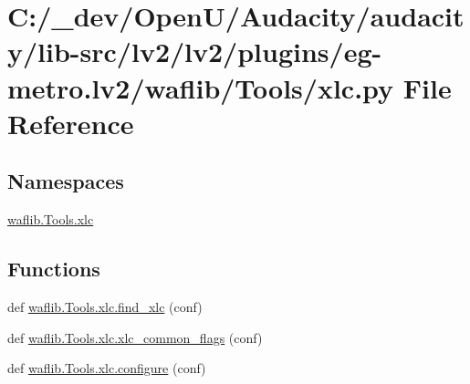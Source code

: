 \hypertarget{lv2_2plugins_2eg-metro_8lv2_2waflib_2_tools_2xlc_8py}{}\section{C\+:/\+\_\+dev/\+Open\+U/\+Audacity/audacity/lib-\/src/lv2/lv2/plugins/eg-\/metro.lv2/waflib/\+Tools/xlc.py File Reference}
\label{lv2_2plugins_2eg-metro_8lv2_2waflib_2_tools_2xlc_8py}
\subsection*{Namespaces}
\begin{DoxyCompactItemize}
\item 
 \hyperlink{namespacewaflib_1_1_tools_1_1xlc}{waflib.\+Tools.\+xlc}
\end{DoxyCompactItemize}
\subsection*{Functions}
\begin{DoxyCompactItemize}
\item 
def \hyperlink{namespacewaflib_1_1_tools_1_1xlc_a826e1c437600d3c067bccbbd4064dec9}{waflib.\+Tools.\+xlc.\+find\+\_\+xlc} (conf)
\item 
def \hyperlink{namespacewaflib_1_1_tools_1_1xlc_ae679a412086a4361649983127db4039d}{waflib.\+Tools.\+xlc.\+xlc\+\_\+common\+\_\+flags} (conf)
\item 
def \hyperlink{namespacewaflib_1_1_tools_1_1xlc_ac8361aabba7f34ddea8a8e153d9d8315}{waflib.\+Tools.\+xlc.\+configure} (conf)
\end{DoxyCompactItemize}
